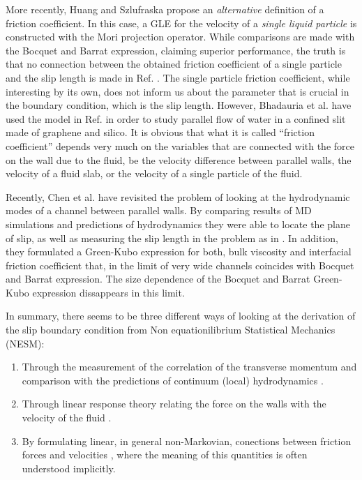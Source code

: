 \documentclass[b5paper,openright,10pt]{book}
\begin{document}
More recently,  Huang and  Szlufraska propose  an \textit{alternative}
definition of a friction  coefficient\cite{Huang2014}. In this case, a
GLE  for   the  velocity  of  a  \textit{single liquid  particle}  is
constructed with the Mori  projection operator.  While comparisons are
made with the Bocquet and Barrat expression,  claiming superior performance, the truth
is that no  connection between the obtained friction  coefficient of a
single particle and the slip length is made in Ref.  \cite{Huang2014}.
The  single particle  friction coefficient,  while interesting  by its
own, does  not inform us  about the parameter  that is crucial  in the
boundary condition, which  is the slip length.   However, Bhadauria et
al. \cite{Bhadauria2015} have used  the model in Ref. \cite{Huang2014}
in order to  study parallel flow of  water in a confined  slit made of
graphene and silico.  It is obvious  that what it is called ``friction
coefficient'' depends  very much on  the variables that  are connected
with  the  force  on the  wall  due  to  the  fluid, be  the  velocity
difference between  parallel walls\cite{Bocquet1994,Petravic2007}, the
velocity of a fluid slab\cite{Hansen2011}, or the velocity of a single
particle of the fluid\cite{Huang2014}.


Recently, Chen  et al. have  revisited the  problem of looking  at the
hydrodynamic modes of a channel between parallel walls\cite{Chen2015}.
By   comparing  results   of   MD  simulations   and  predictions   of
hydrodynamics they were  able to locate the plane of  slip, as well as
measuring the slip length in the problem as in \cite{Bocquet1994}.  In
addition,  they  formulated a  Green-Kubo  expression  for both,  bulk
viscosity and interfacial  friction coefficient that, in  the limit of
very wide channels coincides with  Bocquet and Barrat expression.  The size dependence
of the Bocquet and Barrat Green-Kubo expression dissappears in this limit.

In summary, there  seems to be three different ways  of looking at the
derivation  of  the  slip   boundary  condition  from  Non equationilibrium
Statistical Mechanics (NESM): 
\begin{enumerate}
  \item Through the  measurement of the correlation of
the  transverse  momentum  and  comparison  with  the  predictions  of
continuum  (local) hydrodynamics  \cite{Bocquet1993,Chen2015}.
\item Through
linear  response theory  relating  the  force on  the  walls with  the
velocity   of  the   fluid   \cite{Bocquet1993,Petravic2007}.
\item By
formulating  linear,  in  general  non-Markovian,  conections  between
friction forces and velocities \cite{Hansen2011}, where the meaning of
this quantities is often understood implicitly.
\end{enumerate}
\end{document}

